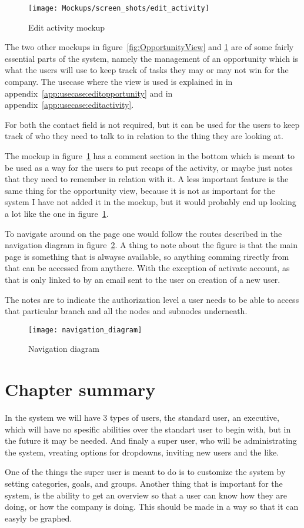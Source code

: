 \begin{figure}[!htb]
  \centering
  \texttt{[image: Mockups/screen\_shots/edit\_activity]}
  \caption{Edit activity mockup}
  \label{fig:ActivityView}
\end{figure}

The two other mockups in figure~\ref{fig:OpportunityView} and
\ref{fig:ActivityView} are of some fairly essential parts of the system, namely
the management of an opportunity which is what the users will use to keep track
of tasks they may or may not win for the company. The usecase where the view is
used is explained in  in
appendix~\ref{app:usecase:editopportunity} and
 in appendix~\ref{app:usecase:editactivity}.


For both the contact field is
not required, but it can be used for the users to keep track of who they need to
talk to in relation to the thing they are looking at.

The mockup in figure~\ref{fig:ActivityView} has a comment section in the bottom
which is meant to be used as a way for the users to put recaps of the activity,
or maybe just notes that they need to remember in relation with it. A less
important feature is the same thing for the opportunity view, because it is not
as important for the system I have not added it in the mockup, but it would
probably end up looking a lot like the one in figure~\ref{fig:ActivityView}. 

To navigate around on the page one would follow the routes described in the
navigation diagram in figure~\ref{fig:navigation_diagram}. A thing to note about
the figure is that the main page is something that is alwayse available, so
anything comming rirectly from that can be accessed from anythere. With the
exception of activate account, as that is only linked to by an email sent to the
user on creation of a new user.

The notes are to indicate the authorization level a user needs to be able to
access that particular branch and all the nodes and subnodes underneath.

\begin{figure}[!htb]
  \centering
  \texttt{[image: navigation\_diagram]}
  \caption{Navigation diagram}
  \label{fig:navigation_diagram}
\end{figure}

\section{Chapter summary}
In the system we will have 3 types of users, the standard user, an executive,
which will have no spesific abilities over the standart user to begin with, but
in the future it may be needed. And finaly a super user, who will be
administrating the system, vreating options for dropdowns, inviting new users
and the like.

One of the things the super user is meant to do is to customize the system by
setting categories, goals, and groups. Another thing that is important for the system,
is the ability to get an overview so that a user can know how they are doing, or
how the company is doing. This should be made in a way so that it can easyly be
graphed.
